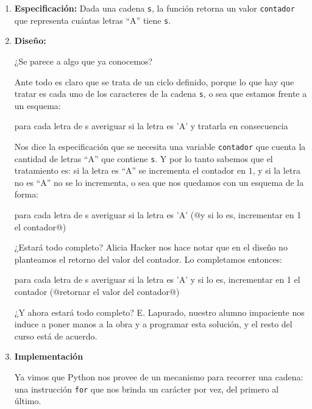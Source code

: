 \begin{enumerate}

\item {\bf Especificación: } Dada una cadena \lstinline!s!, la función
retorna un valor  \lstinline!contador! que representa cuántas letras \enquote{A}
tiene \lstinline!s!.

\item {\bf Diseño: }

¿Se parece a algo que ya conocemos?

Ante todo es claro que se trata de un ciclo definido, porque lo que hay que
tratar es cada uno de los caracteres de la cadena \lstinline!s!, o sea que
estamos frente a un esquema:

\begin{codigo-nohl-sn}
para cada letra de s
    averiguar si la letra es 'A'
    y tratarla en consecuencia
\end{codigo-nohl-sn}

Nos dice la especificación que se necesita una variable
\lstinline!contador! que cuenta la cantidad de letras \enquote{A} que contiene
\lstinline!s!. Y por lo tanto sabemos que el tratamiento es: si la letra es
\enquote{A} se incrementa el contador en $1$, y si la letra no es \enquote{A} no se lo
incrementa, o sea que nos quedamos con un esquema de la forma:

\begin{codigo-nohl-sn}
para cada letra de s
    averiguar si la letra es 'A'
    (@y si lo es, incrementar en 1 el contador@)
\end{codigo-nohl-sn}

¿Estará todo completo? Alicia Hacker nos hace notar que en el diseño no
planteamos el retorno del valor del contador. Lo completamos entonces:

\begin{codigo-nohl-sn}
para cada letra de s
    averiguar si la letra es 'A'
    y si lo es, incrementar en 1 el contador
(@retornar el valor del contador@)
\end{codigo-nohl-sn}

¿Y ahora estará todo completo? E. Lapurado, nuestro alumno impaciente nos
induce a poner manos a la obra y a programar esta solución, y el resto del
curso está de acuerdo.


\item {\bf Implementación}

Ya vimos que Python nos provee de un mecanismo para
recorrer una cadena: una instrucción \lstinline!for! que nos brinda un
carácter por vez, del primero al último.


\end{enumerate}
